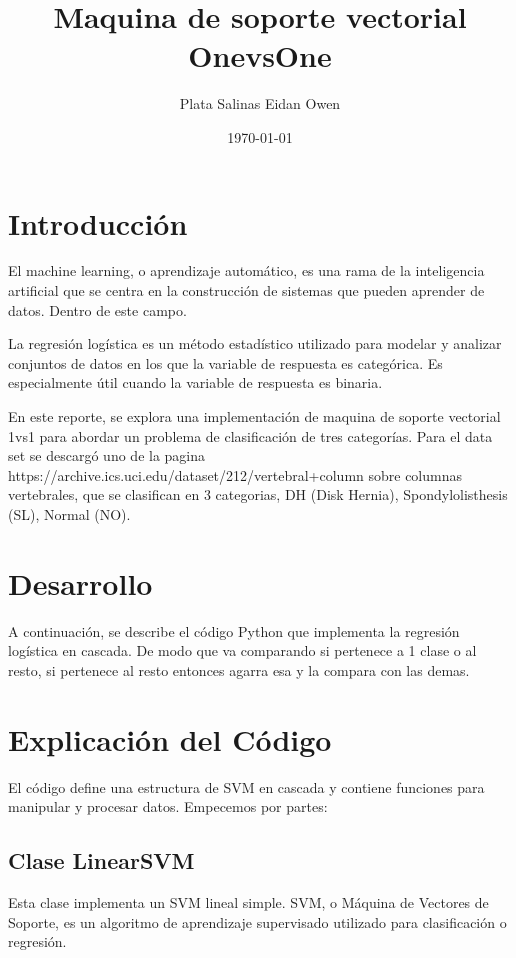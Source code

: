 \documentclass[12pt]{article}
\title{Maquina de soporte vectorial OnevsOne}
\author{Plata Salinas Eidan Owen}
\date{\today}
\begin{document}
\maketitle
\pagebreak

\section*{Introducción}
El machine learning, o aprendizaje automático, es una rama de la inteligencia artificial que se centra en la construcción de sistemas que pueden aprender de datos. Dentro de este campo.

La regresión logística es un método estadístico utilizado para modelar y analizar conjuntos de datos en los que la variable de respuesta es categórica. Es especialmente útil cuando la variable de respuesta es binaria. 

En este reporte, se explora una implementación de maquina de soporte vectorial 1vs1 para abordar un problema de clasificación de tres categorías. Para el data set se descargó uno de la pagina  https://archive.ics.uci.edu/dataset/212/vertebral+column sobre columnas vertebrales, que se clasifican en 3 categorias, DH (Disk Hernia), Spondylolisthesis (SL), Normal (NO).

\section*{Desarrollo}
A continuación, se describe el código Python que implementa la regresión logística en cascada. De modo que va comparando si pertenece a 1 clase o al resto, si pertenece al resto entonces agarra esa y la compara con las demas.
\vspace{1cm}

\section*{Explicación del Código}

El código define una estructura de SVM en cascada y contiene funciones para manipular y procesar datos. Empecemos por partes:

\subsection*{Clase LinearSVM}
Esta clase implementa un SVM lineal simple. SVM, o Máquina de Vectores de Soporte, es un algoritmo de aprendizaje supervisado utilizado para clasificación o regresión.
\end{document}
